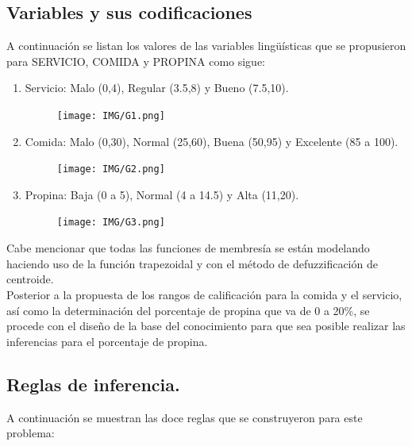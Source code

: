 \documentclass[11pt, letterpaper]{article}
\begin{document}
	\subsection{Variables y sus codificaciones}
	
	
	A continuación se listan los valores de las variables lingüísticas que se propusieron para SERVICIO, COMIDA y PROPINA como sigue:
	
	
	\begin{enumerate}
		\item Servicio: Malo (0,4), Regular (3.5,8) y Bueno (7.5,10).
		\begin{figure}[h]
			\centering
			\texttt{[image: IMG/G1.png]}
		\end{figure}
		
		\item Comida: Malo (0,30), Normal (25,60), Buena (50,95) y Excelente (85 a 100).
		\begin{figure}[h]
			\centering
			\texttt{[image: IMG/G2.png]}
		\end{figure}
		\newpage
		\item Propina: Baja (0 a 5), Normal (4 a 14.5) y Alta (11,20).
		\begin{figure}[h]
			\centering
			\texttt{[image: IMG/G3.png]}
		\end{figure}
	\end{enumerate}
	
	Cabe mencionar que todas las funciones de membresía se están modelando haciendo uso de la función trapezoidal y con el método de defuzzificación de centroide. \\
	
	Posterior a la propuesta de los rangos de calificación para la comida y el servicio, así como la determinación del porcentaje de propina que va de 0 a 20\%, se procede con el diseño de la base del conocimiento para que sea posible realizar las inferencias para el porcentaje de propina.
	
	\subsection{Reglas de inferencia.}
	
	A continuación se muestran las doce reglas que se construyeron para este problema:
	
\end{document}
